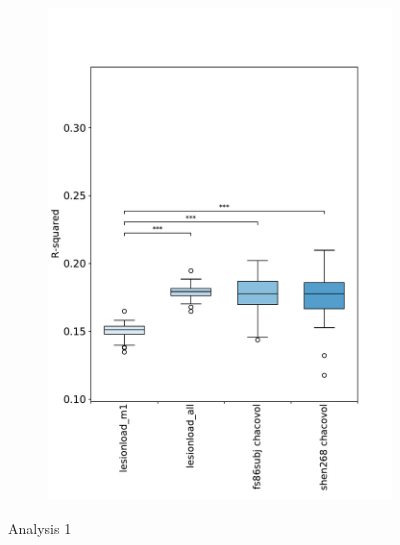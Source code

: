 \documentclass[10pt]{article}
\begin{document}
\begin{figure}
\begin{subfigure}{0.5\textwidth}
  \includegraphics[width=1\linewidth]{figures/analysis_1_boxplots_rsquared.pdf}
  \caption{}
  \label{fig:sfig1}
\end{subfigure}
\caption{Analysis 1}
\label{fig:fig}
\end{figure}
\end{document}
